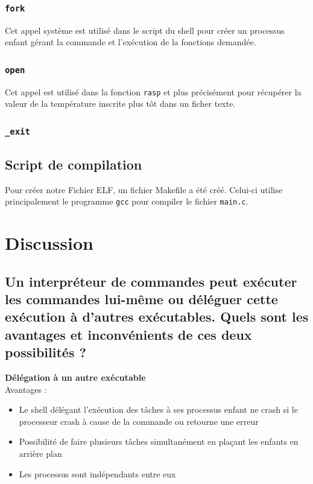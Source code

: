 \documentclass[10pt,a4paper]{article}
\begin{document}
\subsubsection{\texttt{fork}}
Cet appel système est utilisé dans le script du shell pour créer un processus enfant gérant la commande et l'exécution de la fonctions demandée. 

\subsubsection{\texttt{open}}
Cet appel est utilisé dans la fonction \texttt{rasp} et plus précisément pour récupérer la valeur de la température inscrite plus tôt dans un ficher texte. 

\subsubsection{\texttt{\_exit}}


\subsection{Script de compilation}
Pour créer notre Fichier ELF, un fichier Makefile a été créé. Celui-ci utilise principalement le programme \texttt{gcc} pour compiler le fichier \texttt{main.c}. 

\section{Discussion}
\subsection*{Un interpréteur de commandes peut exécuter les commandes lui-même ou déléguer cette exécution à d'autres exécutables. Quels sont les avantages et inconvénients de ces deux possibilités ?}

\textbf{Délégation à un autre exécutable\\}
Avantages :
\begin{itemize}
\item Le shell délégant l'exécution des tâches à ses processus enfant ne crash si le processeur crash à cause de la commande ou retourne une erreur 

\item Possibilité de faire plusieurs tâches simultanément en plaçant les enfants en arrière plan

\item Les processus sont indépendants entre eux
\end{itemize}
\end{document}
